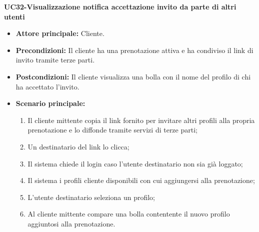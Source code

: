 \textbf{UC32-Visualizzazione notifica accettazione invito da parte di altri utenti}
\begin{itemize}
\item \textbf{Attore principale:} Cliente.
\item \textbf{Precondizioni:} Il cliente ha una prenotazione attiva e ha condiviso il link di invito tramite terze parti.
\item \textbf{Postcondizioni:} Il cliente visualizza una bolla con il nome del profilo di chi ha accettato l'invito.
\item \textbf{Scenario principale:}
\begin{enumerate}
    \item Il cliente mittente copia il link fornito per invitare altri profili alla propria prenotazione e lo diffonde tramite
      servizi di terze parti;
    \item Un destinatario del link lo clicca;
    \item Il sistema chiede il login caso l'utente destinatario non sia già loggato;
    \item Il sistema i profili cliente disponibili con cui aggiungersi alla prenotazione;
    \item L'utente destinatario seleziona un profilo;
    \item Al cliente mittente compare una bolla contentente il nuovo profilo aggiuntosi alla prenotazione.
\end{enumerate}
\end{itemize}

